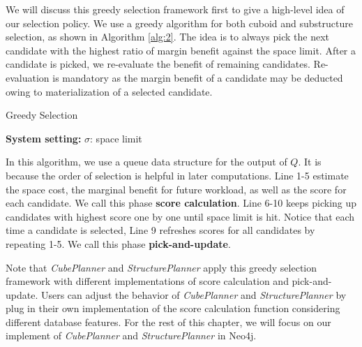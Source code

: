 	We will discuss this greedy selection framework first to give a high-level idea of our selection policy. We use a greedy algorithm for both cuboid and substructure selection, as shown in Algorithm \ref{alg:2}. The idea is to always pick the next candidate with the highest ratio of margin benefit against the space limit. After a candidate is picked, we re-evaluate the benefit of remaining candidates. Re-evaluation is mandatory as the margin benefit of a candidate may be deducted owing to materialization of a selected candidate.
	
	
	\begin{algorithm}[H]
		\label{alg:2}
		\caption{Greedy Selection}
		\LinesNumbered
		\textbf{System setting:} $\sigma$: space limit\\
		
	\end{algorithm}
	
	In this algorithm, we use a queue data structure for the output of $Q$. It is because the order of selection is helpful in later computations. %
	Line 1-5 estimate the space cost, the marginal benefit for future workload, as well as the score for each candidate. We call this phase  \textbf{score calculation}. Line 6-10 keeps picking up candidates with highest score one by one until space limit is hit. Notice that each time a candidate is selected, Line 9 refreshes scores for all candidates by repeating 1-5. We call this phase \textbf{pick-and-update}.
	
	Note that \emph{CubePlanner} and \emph{StructurePlanner} apply this greedy selection framework with different implementations of score calculation and pick-and-update. Users can adjust the behavior of \emph{CubePlanner} and \emph{StructurePlanner} by plug in their own implementation of the score calculation function considering different database features. For the rest of this chapter, we will focus on our implement of  \emph{CubePlanner} and \emph{StructurePlanner} in Neo4j.
	
